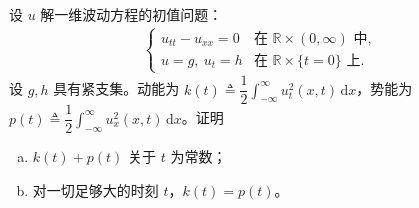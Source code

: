 \documentclass[../../main.tex]{subfiles}
\begin{document}
\begin{exercise}[能量均分]\label{exercise:ch02-24}设 $u$ 解一维波动方程的初值问题：
\begin{align*}
\begin{cases}
u_{tt}-u_{xx}=0 & \text{在 }\mathbb{R}\times(0,\infty)\text{ 中},\\
u=g,\ u_t=h & \text{在 }\mathbb{R}\times\{t=0\}\text{ 上}.
\end{cases}
\end{align*}
设 $g,h$ 具有紧支集。动能为 $k(t)\triangleq\dfrac{1}{2}\displaystyle\int_{-\infty}^{\infty}u_t^2(x,t)\,\mathrm{d}x$，势能为 $p(t)\triangleq\dfrac{1}{2}\displaystyle\int_{-\infty}^{\infty}u_x^2(x,t)\,\mathrm{d}x$。证明
\begin{enumerate}[(a)]
\item $k(t)+p(t)$ 关于 $t$ 为常数；
\item 对一切足够大的时刻 $t$，$k(t)=p(t)$。
\end{enumerate}
\end{exercise}
\end{document}

